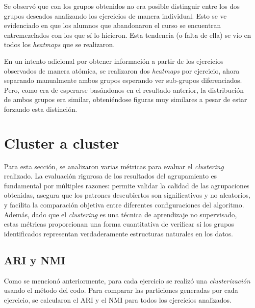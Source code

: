 \documentclass[11pt,a4paper,twoside,openany]{tesis}
\begin{document}
Se observó que con los grupos obtenidos no era posible distinguir entre los dos grupos deseados analizando los ejercicios de manera individual. Esto se ve evidenciado en que los alumnos que abandonaron el curso se encuentran entremezclados con los que sí lo hicieron. Esta tendencia (o falta de ella) se vio en todos los \emph{heatmaps} que se realizaron. 


En un intento adicional por obtener información a partir de los ejercicios observados de manera atómica, se realizaron dos \emph{heatmaps} por ejercicio, ahora separando manualmente ambos grupos esperando ver sub-grupos diferenciados. Pero, como era de esperarse basándonos en el resultado anterior, la distribución de ambos grupos era similar, obteniéndose figuras muy similares a pesar de estar forzando esta distinción.

\section{Cluster a cluster}
Para esta sección, se analizaron varias métricas para evaluar el \emph{clustering} realizado. La evaluación rigurosa de los resultados del agrupamiento es fundamental por múltiples razones: permite validar la calidad de las agrupaciones obtenidas, asegura que los patrones descubiertos son significativos y no aleatorios, y facilita la comparación objetiva entre diferentes configuraciones del algoritmo. Además, dado que el \emph{clustering} es una técnica de aprendizaje no supervisado, estas métricas proporcionan una forma cuantitativa de verificar si los grupos identificados representan verdaderamente estructuras naturales en los datos.

\subsection{ARI y NMI}
Como se mencionó anteriormente, para cada ejercicio se realizó una \emph{clusterización} usando el método del codo. Para comparar las particiones generadas por cada ejercicio, se calcularon el ARI \cite{ari} y el NMI \cite{nmi} para todos los ejercicios analizados.
\end{document}
